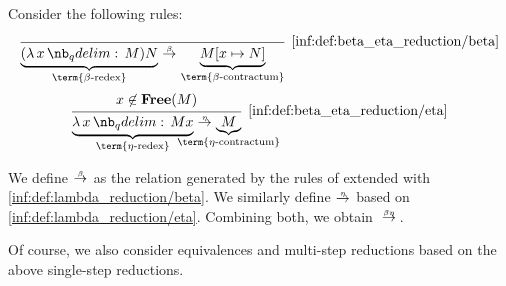 \begin{definition}\label{def:beta_eta_reduction}
  Consider the following rules:
  \begin{TwoColumns}
    \begin{equation*}\taglabel[\ensuremath{ \logic{Red}_\beta }]{inf:def:beta_eta_reduction/beta}
      \begin{prooftree}
        \infer0[\ref{inf:def:beta_eta_reduction/beta}]{ \underbrace{(\qabs x M) N}_{\T{\term{\( \beta \)-redex}}} \bred \underbrace{M[x \mapsto N]}_{\T{\term{\( \beta \)-contractum}}} }.
      \end{prooftree}
    \end{equation*}
  \BeginSecondColumn
    \begin{equation*}\taglabel[\ensuremath{ \logic{Red}_\eta }]{inf:def:beta_eta_reduction/eta}
      \begin{prooftree}
        \hypo{ x \not\in \op*{Free}(M) }
        \infer1[\ref{inf:def:beta_eta_reduction/eta}]{ \underbrace{\qabs x M x}_{\T{\term{\( \eta \)-redex}}} \ered \underbrace{M}_{\mathclap{\T{\term{\( \eta \)-contractum}}}} }.
      \end{prooftree}
    \end{equation*}
  \end{TwoColumns}

  We define  \( {\bred} \) as the relation generated by the rules of  extended with \ref{inf:def:lambda_reduction/beta}. We similarly define  \( {\ered} \) based on \ref{inf:def:lambda_reduction/eta}. Combining both, we obtain  \( {\bered} \).
\end{definition}
\begin{comments}
  \item Of course, we also consider equivalences and multi-step reductions based on the above single-step reductions.
\end{comments}

